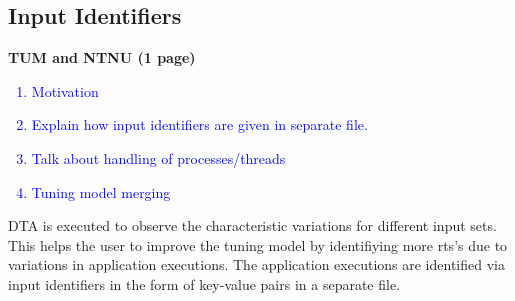 \subsection{Input Identifiers} \label{sec:input}
\textbf{TUM and NTNU (1 page)}
\textcolor{blue}{
\begin{enumerate}
	\item Motivation
	\item Explain how input identifiers are given in separate file.
	\item Talk about handling of processes/threads
	\item Tuning model merging
\end{enumerate}}
DTA is executed to observe the characteristic variations for different input sets. This helps the user to improve the tuning model by identifiying more rts's due to variations in application executions. The application executions are identified via input identifiers in the form of key-value pairs in a separate file.